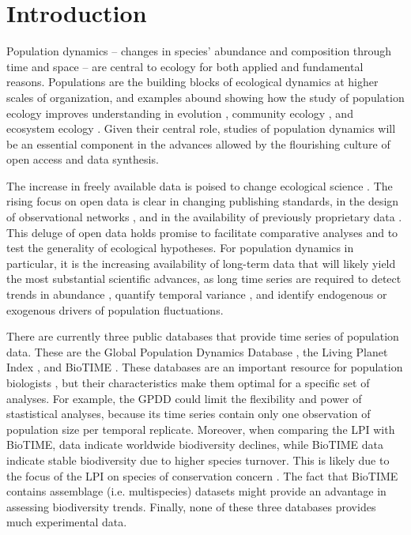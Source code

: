\documentclass{article}\usepackage[]{graphicx}\usepackage[]{color}
\begin{document}
\newpage
\section*{Introduction}

Population dynamics – changes in species’ abundance and composition through time and space – are central to ecology for both applied and fundamental reasons. Populations are the building blocks of ecological dynamics at higher scales of organization, and examples abound showing how the study of population ecology improves understanding in evolution \citep{Metcalf2007}, community ecology \citep{Levine2009}, and ecosystem ecology \citep{Medvigy2009,Fisher2018}. Given their central role, studies of population dynamics will be an essential component in the advances allowed by the flourishing culture of open access and data synthesis.

The increase in freely available data is poised to change ecological science \citep{Laurance2016}. The rising focus on open data is clear in changing publishing standards, in the design of observational networks \citep{schimel2007neon}, and in the availability of previously proprietary data \citep{Kratz2003,Bechtold2005}. This deluge of open data holds promise to facilitate comparative analyses and to test the generality of ecological hypotheses. For population dynamics in particular, it is the increasing availability of long-term data that will likely yield the most substantial scientific advances, as long time series are required to detect trends in abundance \citep{Lindenmayer2012}, quantify temporal variance \citep{Compagnoni2016}, and identify endogenous \citep{Knape2012} or exogenous \citep{Hampton2013} drivers of population fluctuations.

There are currently three public databases that provide time series of population data. These are the Global Population Dynamics Database \citep[GPDD,][]{Inchausti2001}, the Living Planet Index \citep{loh2005living}, and BioTIME \citep{dornelas2018biotime}. These databases are an important resource for population biologists \citep[e.g.,][]{Knape2012}, but their characteristics make them optimal for a specific set of analyses. For example, the GPDD could limit the flexibility and power of stastistical analyses, because its time series contain only one observation of population size per temporal replicate. Moreover, when comparing the LPI with BioTIME, data indicate worldwide biodiversity declines, while BioTIME data indicate stable biodiversity due to higher species turnover. This is likely due to the focus of the LPI on species of conservation concern \citep{dornelas2019balance}. The fact that BioTIME contains assemblage (i.e. multispecies) datasets might provide an advantage in assessing biodiversity trends. Finally, none of these three databases provides much experimental data. 
\end{document}
